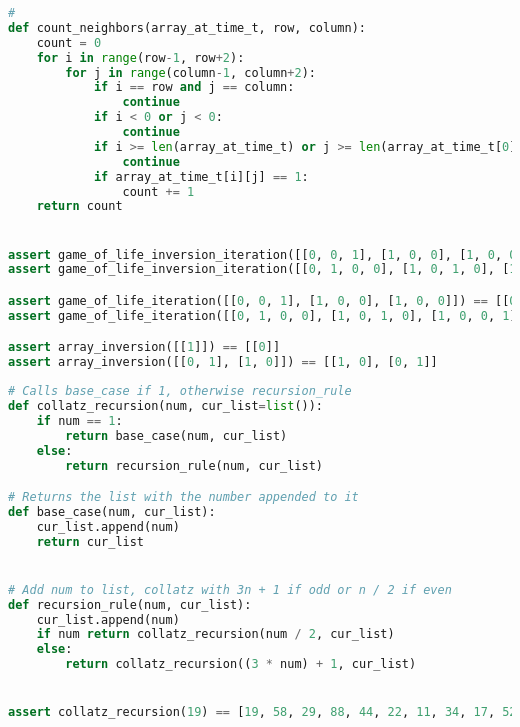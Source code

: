 \begin{figure*}[h]
\begin{lstlisting}[language=Python]
# 
def count_neighbors(array_at_time_t, row, column):
    count = 0
    for i in range(row-1, row+2):
        for j in range(column-1, column+2):
            if i == row and j == column:
                continue
            if i < 0 or j < 0:
                continue
            if i >= len(array_at_time_t) or j >= len(array_at_time_t[0]):
                continue
            if array_at_time_t[i][j] == 1:
                count += 1
    return count


assert game_of_life_inversion_iteration([[0, 0, 1], [1, 0, 0], [1, 0, 0]]) == [[1, 1, 1], [1, 0, 1], [1, 1, 1]]
assert game_of_life_inversion_iteration([[0, 1, 0, 0], [1, 0, 1, 0], [1, 0, 0, 1], [0, 1, 1, 0]]) == [[1, 0, 1, 1], [0, 1, 0, 1], [0, 1, 1, 0], [1, 0, 0, 1]]

assert game_of_life_iteration([[0, 0, 1], [1, 0, 0], [1, 0, 0]]) == [[0, 0, 0], [0, 1, 0], [0, 0, 0]]
assert game_of_life_iteration([[0, 1, 0, 0], [1, 0, 1, 0], [1, 0, 0, 1], [0, 1, 1, 0]]) == [[0, 1, 0, 0], [1, 0, 1, 0], [1, 0, 0, 1], [0, 1, 1, 0]]

assert array_inversion([[1]]) == [[0]]
assert array_inversion([[0, 1], [1, 0]]) == [[1, 0], [0, 1]]
\end{lstlisting}
\caption{Compilation of the program taking Conway's game of life \citep{games1970fantastic} and returning the next state, with the values inverted. In this case, we use automatic infilling to generate the \lstinline{count_neighbors} function.}
\label{pygameoflife2}
\end{figure*}

\begin{figure*}[h]
\begin{lstlisting}[language=Python]
# Calls base_case if 1, otherwise recursion_rule
def collatz_recursion(num, cur_list=list()):
    if num == 1:
        return base_case(num, cur_list)
    else:
        return recursion_rule(num, cur_list)

# Returns the list with the number appended to it
def base_case(num, cur_list):
    cur_list.append(num)
    return cur_list


# Add num to list, collatz with 3n + 1 if odd or n / 2 if even
def recursion_rule(num, cur_list):
    cur_list.append(num)
    if num return collatz_recursion(num / 2, cur_list)
    else:
        return collatz_recursion((3 * num) + 1, cur_list)


assert collatz_recursion(19) == [19, 58, 29, 88, 44, 22, 11, 34, 17, 52, 26, 13, 40, 20, 10, 5, 16, 8, 4, 2, 1]
\end{lstlisting}
\caption{Compilation of the program generating a list corresponding to the Collatz conjecture.}
\label{pycollatz}
\end{figure*}

